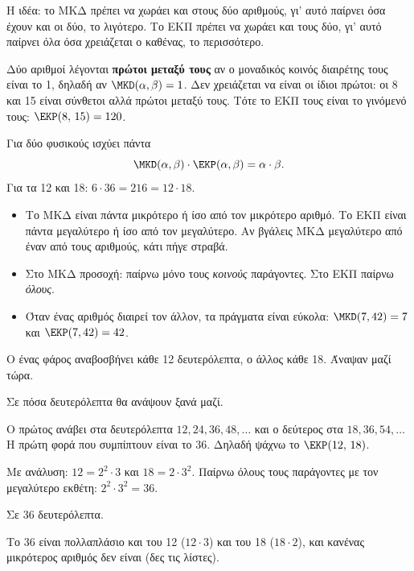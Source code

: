 Η ιδέα: το ΜΚΔ πρέπει να χωράει και στους δύο αριθμούς, γι' αυτό παίρνει όσα έχουν και οι δύο, το λιγότερο. Το ΕΚΠ πρέπει να χωράει και τους δύο, γι' αυτό παίρνει όλα όσα χρειάζεται ο καθένας, το περισσότερο.


Δύο αριθμοί λέγονται \textbf{πρώτοι μεταξύ τους} αν ο μοναδικός κοινός διαιρέτης τους είναι το 1, δηλαδή αν $\MKD(\alpha,\beta)=1$. Δεν χρειάζεται να είναι οι ίδιοι πρώτοι: οι 8 και 15 είναι σύνθετοι αλλά πρώτοι μεταξύ τους. Τότε το ΕΚΠ τους είναι το γινόμενό τους: $\EKP(8,\,15)=120$.

Για δύο φυσικούς ισχύει πάντα
$$\MKD(\alpha,\beta)\cdot\EKP(\alpha,\beta)=\alpha\cdot\beta.$$
Για τα 12 και 18: $6\cdot 36=216=12\cdot 18$.

\begin{prosoxi}
\begin{itemize}[leftmargin=1.2em,itemsep=0.3ex,topsep=2pt]
\item Το ΜΚΔ είναι πάντα μικρότερο ή ίσο από τον μικρότερο αριθμό. Το ΕΚΠ είναι πάντα μεγαλύτερο ή ίσο από τον μεγαλύτερο. Αν βγάλεις ΜΚΔ μεγαλύτερο από έναν από τους αριθμούς, κάτι πήγε στραβά.
\item Στο ΜΚΔ προσοχή: παίρνω μόνο τους \emph{κοινούς} παράγοντες. Στο ΕΚΠ παίρνω \emph{όλους}.
\item Όταν ένας αριθμός διαιρεί τον άλλον, τα πράγματα είναι εύκολα: $\MKD(7,42)=7$ και $\EKP(7,42)=42$.
\end{itemize}
\end{prosoxi}


\tixero Ο ένας φάρος αναβοσβήνει κάθε 12 δευτερόλεπτα, ο άλλος κάθε 18. Άναψαν μαζί τώρα.\par
\tithelo Σε πόσα δευτερόλεπτα θα ανάψουν ξανά μαζί.\par
\possindeo Ο πρώτος ανάβει στα δευτερόλεπτα $12, 24, 36, 48, \dots$ και ο δεύτερος στα $18, 36, 54, \dots$ Η πρώτη φορά που συμπίπτουν είναι το 36. Δηλαδή ψάχνω το $\EKP(12,\,18)$.\par
Με ανάλυση: $12=2^2\cdot 3$ και $18=2\cdot 3^2$. Παίρνω όλους τους παράγοντες με τον μεγαλύτερο εκθέτη: $2^2\cdot 3^2=36$.\par
\apantisi Σε 36 δευτερόλεπτα.\par
\elegxos Το 36 είναι πολλαπλάσιο και του 12 ($12\cdot 3$) και του 18 ($18\cdot 2$), και κανένας μικρότερος αριθμός δεν είναι (δες τις λίστες).

